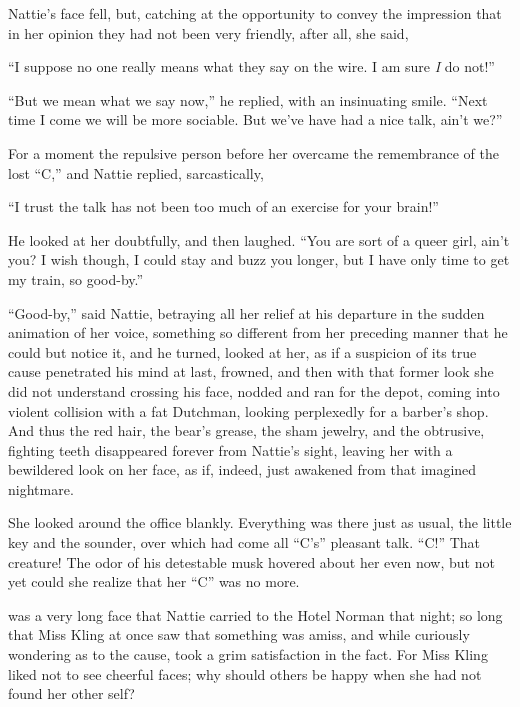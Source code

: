 Nattie's face fell, but, catching at the opportunity to convey the
impression that in her opinion they had not been very friendly, after
all, she said,

``I suppose no one really means what they say on the wire. I am sure \emph{I} do
not!''

``But we mean what we say now,'' he replied, with an insinuating smile.
``Next time I come we will be more sociable. But we've have had a nice
talk, ain't we?''

For a moment the repulsive person before her overcame the remembrance of
the lost ``C,'' and Nattie replied, sarcastically,

``I trust the talk has not been too much of an exercise for your brain!''

He looked at her doubtfully, and then laughed. ``You are sort of a queer
girl, ain't you? I wish though, I could stay and buzz you longer, but I
have only time to get my train, so good-by.''

``Good-by,'' said Nattie, betraying all her relief at his departure in the
sudden animation of her voice, something so different from her preceding
manner that he could but notice it, and he turned, looked at her, as if
a suspicion of its true cause penetrated his mind at last, frowned, and
then with that former look she did not understand crossing his face,
nodded and ran for the depot, coming into violent collision with a fat
Dutchman, looking perplexedly for a barber's shop. And thus the red
hair, the bear's grease, the sham jewelry, and the obtrusive, fighting
teeth disappeared forever from Nattie's sight, leaving her with a
bewildered look on her face, as if, indeed, just awakened from that
imagined nightmare.

She looked around the office blankly. Everything was there just as
usual, the little key and the sounder, over which had come all ``C's''
pleasant talk. ``C!'' That creature! The odor of his detestable musk
hovered about her even now, but not yet could she realize that her ``C''
was no more.








 was a very long face that Nattie carried to the Hotel Norman that
night; so long that Miss Kling at once saw that something was amiss, and
while curiously wondering as to the cause, took a grim satisfaction in
the fact. For Miss Kling liked not to see cheerful faces; why should
others be happy when she had not found her other self?

